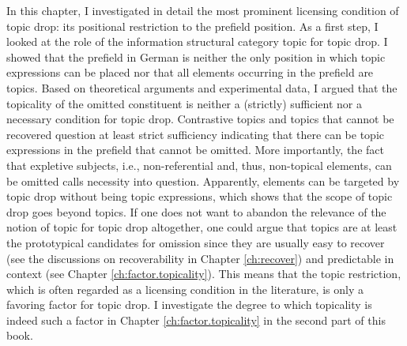 In this chapter, I investigated in detail the most prominent licensing condition of topic drop:
its positional restriction to the prefield position.
As a first step, I looked at the role of the information structural category topic for topic drop.
I showed that the prefield in German is neither the only position in which topic expressions can be placed nor that all elements occurring in the prefield are topics.
Based on theoretical arguments and experimental data, I argued that the topicality of the omitted constituent is neither a (strictly) sufficient nor a necessary condition for topic drop.
Contrastive topics  and topics that cannot be recovered  question at least strict sufficiency indicating that there can be topic expressions in the prefield that cannot be omitted.
More importantly, the fact that expletive  subjects, i.e., non-referential and, thus, non-topical elements, can be omitted calls necessity into question.
Apparently, elements can be targeted by topic drop without being topic expressions, which shows that the scope of topic drop goes beyond topics.
If one does not want to abandon the relevance of the notion of topic for topic drop altogether, one could argue that topics are at least the prototypical candidates for omission since they are usually easy to recover (see the discussions on recoverability  in Chapter \ref{ch:recover}) and predictable  in context (see Chapter \ref{ch:factor.topicality}).
This means that the topic restriction, which is often regarded as a licensing condition in the literature, is only a favoring factor for topic drop.
I investigate the degree to which topicality is indeed such a factor in Chapter \ref{ch:factor.topicality} in the second part of this book.

